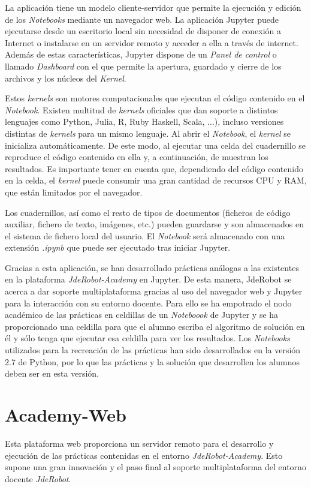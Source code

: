 La aplicación tiene un modelo cliente-servidor que permite la ejecución y edición de los \textit{Notebooks} mediante un navegador web. La aplicación Jupyter puede ejecutarse desde un escritorio local sin necesidad de disponer de conexión a Internet o instalarse en un servidor remoto y acceder a ella a través de internet. Además de estas características, Jupyter dispone de un \textit{Panel de control} o llamado \textit{Dashboard} con el que permite la apertura, guardado y cierre de los archivos y los núcleos del \textit{Kernel}.

Estos \textit{kernels} son motores computacionales que ejecutan el código contenido en el \textit{Notebook}. Existen multitud de \textit{kernels} oficiales que dan soporte a distintos lenguajes como Python, Julia, R, Ruby Haskell, Scala, ...), incluso versiones distintas de \textit{kernels} para un mismo lenguaje. Al abrir el \textit{Notebook}, el \textit{kernel} se inicializa automáticamente. De este modo, al ejecutar una celda del cuadernillo se reproduce el código contenido en ella y, a continuación, de muestran los resultados. Es importante tener en cuenta que, dependiendo del código contenido en la celda, el \textit{kernel} puede consumir una gran cantidad de recursos CPU y RAM, que están limitados por el navegador.

Los cuadernillos, así como el resto de tipos de documentos (ficheros de código auxiliar, fichero de texto, imágenes, etc.) pueden guardarse y son almacenados en el sistema de fichero local del usuario. El \textit{Notebook} será almacenado con una extensión \textit{.ipynb} que puede ser ejecutado tras iniciar Jupyter.

Gracias a esta aplicación, se han desarrollado prácticas análogas a las existentes en la plataforma \textit{JdeRobot-Academy} en Jupyter. De esta manera, JdeRobot se acerca a dar soporte multiplataforma gracias al uso del navegador web y Jupyter para la interacción con su entorno docente. Para ello se ha empotrado el nodo académico de las prácticas en celdillas de un \textit{Noteboook} de Jupyter y se ha proporcionado una celdilla para que el alumno escriba el algoritmo de solución en él y sólo tenga que ejecutar esa celdilla para ver los resultados.
Los \textit{Notebooks} utilizados para la recreación de las prácticas han sido desarrollados en la versión 2.7 de Python, por lo que las prácticas y la solución que desarrollen los alumnos deben ser en esta versión.

\section{Academy-Web}
Esta plataforma web proporciona un servidor remoto para el desarrollo y ejecución de las prácticas contenidas en el entorno \textit{JdeRobot-Academy}. Esto supone una gran innovación y el paso final al soporte multiplataforma del entorno docente \textit{JdeRobot}.

